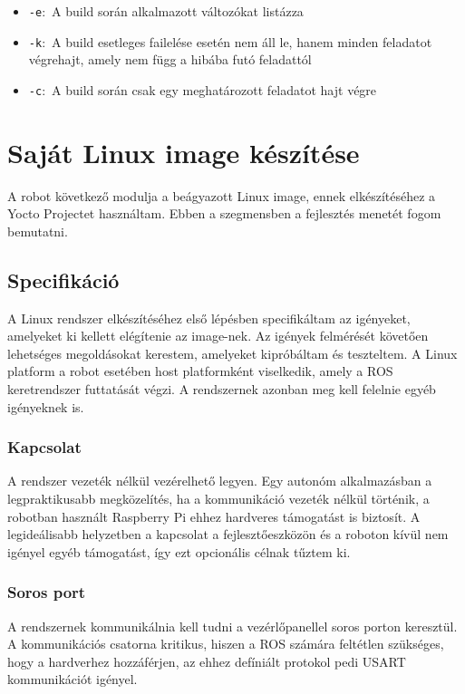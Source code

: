 \begin{itemize}
\item{\verb|-e|:~A build során alkalmazott változókat listázza}
\item{\verb|-k|:~A build esetleges failelése esetén nem áll le, hanem minden
  feladatot végrehajt, amely nem függ a hibába futó feladattól}
\item{\verb|-c|:~A build során csak egy meghatározott feladatot hajt végre}
\end{itemize}

\section{Saját Linux image készítése}

A robot következő modulja a beágyazott Linux image, ennek elkészítéséhez a Yocto
Projectet használtam. Ebben a szegmensben a fejlesztés menetét fogom bemutatni.

\subsection{Specifikáció}

A Linux rendszer elkészítéséhez első lépésben specifikáltam az igényeket,
amelyeket ki kellett elégítenie az image-nek. Az igények felmérését követően
lehetséges megoldásokat kerestem, amelyeket kipróbáltam és teszteltem. A Linux
platform a robot esetében host platformként viselkedik, amely a ROS keretrendszer
futtatását végzi. A rendszernek azonban meg kell felelnie egyéb igényeknek is.

\subsubsection{Kapcsolat}

A rendszer vezeték nélkül vezérelhető legyen. Egy autonóm alkalmazásban a
legpraktikusabb megközelítés, ha a kommunikáció vezeték nélkül történik, a
robotban használt Raspberry Pi ehhez hardveres támogatást is biztosít. A
legideálisabb helyzetben a kapcsolat a fejlesztőeszközön és a roboton kívül nem
igényel egyéb támogatást, így ezt opcionális célnak tűztem ki.

\subsubsection{Soros port}

A rendszernek kommunikálnia kell tudni a vezérlőpanellel soros porton keresztül.
A kommunikációs csatorna kritikus, hiszen a ROS számára feltétlen szükséges, hogy
a hardverhez hozzáférjen, az ehhez defíniált protokol pedi USART kommunikációt
igényel.

